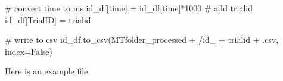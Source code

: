 \documentclass[
  letterpaper,
  DIV=11,
  numbers=noendperiod]{scrreprt}
\newenvironment{Shaded}{\begin{snugshade}}{\end{snugshade}}
\newcommand{\CommentTok}[1]{\textcolor[rgb]{0.37,0.37,0.37}{#1}}
\newcommand{\DecValTok}[1]{\textcolor[rgb]{0.68,0.00,0.00}{#1}}
\newcommand{\NormalTok}[1]{\textcolor[rgb]{0.00,0.23,0.31}{#1}}
\newcommand{\OperatorTok}[1]{\textcolor[rgb]{0.37,0.37,0.37}{#1}}
\newcommand{\StringTok}[1]{\textcolor[rgb]{0.13,0.47,0.30}{#1}}
\newcommand{\VariableTok}[1]{\textcolor[rgb]{0.07,0.07,0.07}{#1}}
\begin{document}
\begin{Shaded}
\begin{Highlighting}[]
    \CommentTok{\# convert time to ms}
\NormalTok{    id\_df[}\StringTok{\textquotesingle{}time\textquotesingle{}}\NormalTok{] }\OperatorTok{=}\NormalTok{ id\_df[}\StringTok{\textquotesingle{}time\textquotesingle{}}\NormalTok{]}\OperatorTok{*}\DecValTok{1000}
        \CommentTok{\# add trialid}
\NormalTok{    id\_df[}\StringTok{\textquotesingle{}TrialID\textquotesingle{}}\NormalTok{] }\OperatorTok{=}\NormalTok{ trialid}

    \CommentTok{\# write to csv}
\NormalTok{    id\_df.to\_csv(MTfolder\_processed }\OperatorTok{+} \StringTok{\textquotesingle{}/id\_\textquotesingle{}} \OperatorTok{+}\NormalTok{ trialid }\OperatorTok{+} \StringTok{\textquotesingle{}.csv\textquotesingle{}}\NormalTok{, index}\OperatorTok{=}\VariableTok{False}\NormalTok{)}
\end{Highlighting}
\end{Shaded}

Here is an example file
\end{document}
